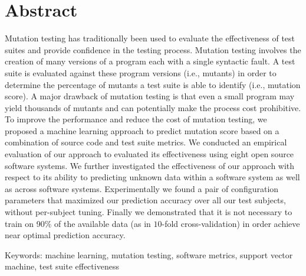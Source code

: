 \chapter*{Abstract}
Mutation testing has traditionally been used to evaluate the effectiveness of test suites and provide confidence in the testing process. Mutation testing involves the creation of many versions of a program each with a single syntactic fault. A test suite is evaluated against these program versions (i.e., mutants) in order to determine the percentage of mutants a test suite is able to identify (i.e., mutation score). A major drawback of mutation testing is that even a small program may yield thousands of mutants and can potentially make the process cost prohibitive. To improve the performance and reduce the cost of mutation testing, we proposed a machine learning approach to predict mutation score based on a combination of source code and test suite metrics. We conducted an empirical evaluation of our approach to evaluated its effectiveness using eight open source software systems. We further investigated the effectiveness of our approach with respect to its ability to predicting unknown data within a software system as well as across software systems. Experimentally we found a pair of configuration parameters that maximized our prediction accuracy over all our test subjects, without per-subject tuning. Finally we demonstrated that it is not necessary to train on 90\% of the available data (as in $10$-fold cross-validation) in order achieve near optimal prediction accuracy.

Keywords: machine learning, mutation testing, software metrics, support vector machine, test suite effectiveness
